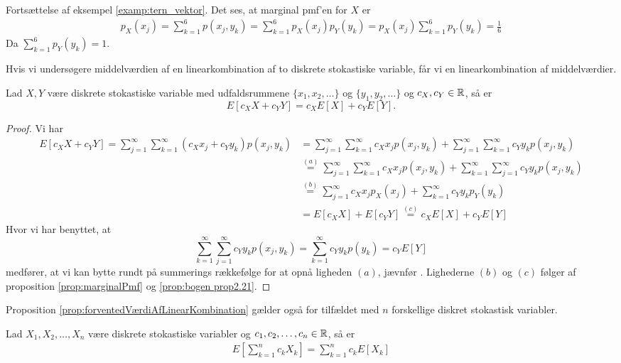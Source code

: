 \begin{exmp}
    Fortsættelse af  eksempel \ref{examp:tern_vektor}. Det ses, at marginal pmf'en for $X$ er 
    \begin{align*}
        p_X(x_j)=\sum_{k=1}^6 p(x_j,y_k)=\sum_{k=1}^6 p_X(x_j)p_Y(y_k) = p_X(x_j) \sum_{k=1}^6 p_Y(y_k)
        =\frac{1}{6}
    \end{align*}
    Da $\sum^6_{k = 1} p_Y(y_k) = 1$.
\end{exmp}

Hvis vi undersøgere middelværdien af en linearkombination af to diskrete stokastiske variable, får vi en linearkombination af middelværdier.
\begin{prop}\label{prop:forventedVærdiAfLinearKombination} %
Lad $X, Y$ være diskrete stokastiske variable med udfaldsrummene $\{x_1, x_2, \ldots \}$ og $\{y_1, y_2, \ldots \}$ og $c_X, c_Y \in \mathbb{R}$, så er
\begin{equation*}
    E[c_XX+c_YY] = c_XE[X] + c_YE[Y].
\end{equation*}
\end{prop}

\begin{proof}
Vi har
\begin{align*}
    E[c_XX + c_YY] = \sum^\infty_{j = 1} \sum^\infty_{k = 1} (c_X x_j + c_Y y_k) p(x_j, y_k) &= \sum^\infty_{j = 1} \sum^\infty_{k = 1} c_X x_j p(x_j, y_k) + \sum^\infty_{j = 1} \sum^\infty_{k = 1} c_Y y_k p(x_j, y_k) \\
    &\stackrel{(a)}= \sum^\infty_{j = 1} \sum^\infty_{k = 1} c_X x_j p(x_j, y_k) + \sum^\infty_{k = 1} \sum^\infty_{j = 1} c_Y y_k p(x_j, y_k) \\
    &\stackrel{(b)}= \sum^\infty_{j = 1} c_X x_j p_X(x_j) + \sum^\infty_{k = 1} c_Y y_k p_Y(y_k)\\
    &= E[c_XX] +  E[c_YY] \stackrel{(c)}= c_X E[X] + c_Y E[Y]
\end{align*}
Hvor vi har benyttet, at 
\begin{equation*}
    \sum^\infty_{k = 1} \sum^\infty_{j = 1} c_Y y_k p(x_j, y_k) = \sum^\infty_{k = 1} c_Y y_k p(y_k) = c_YE[Y]
\end{equation*}
medfører, at vi kan bytte rundt på summerings rækkefølge for at opnå ligheden $(a)$, jævnfør \cite{horiaPowerSerieNoter}.
Lighederne $(b)$ og $(c)$ følger af proposition \ref{prop:marginalPmf} og \ref{prop:bogen prop2.21}.
\end{proof}

Proposition \ref{prop:forventedVærdiAfLinearKombination} gælder også for tilfældet med $n$ forskellige diskret stokastisk variabler.
\begin{cor}\label{cor:sumAfDiskreteVariable} %
Lad $X_1, X_2, \ldots, X_n$ være diskrete stokastiske variabler og $c_1, c_2, \ldots, c_n \in \mathbb{R}$, så er 
\begin{align*}
    E\left[\sum^n_{k = 1} c_k X_k\right] = \sum^n_{k = 1} c_k E[X_k]
\end{align*}
\end{cor}

